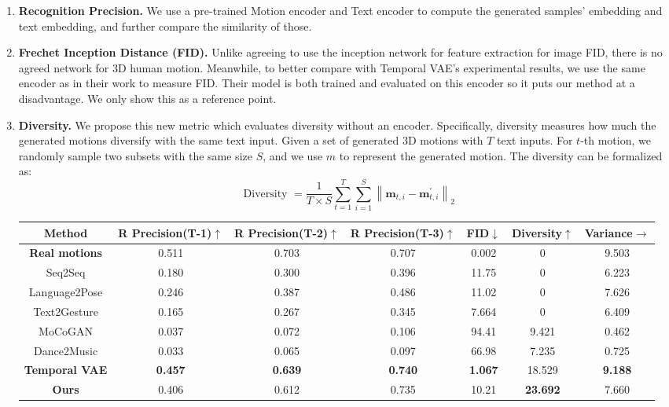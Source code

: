 \documentclass{article}
\begin{document}
\begin{enumerate}
  \item \textbf{Recognition Precision.} We use a pre-trained Motion encoder and Text encoder to compute the generated samples' embedding and text embedding, and further compare the similarity of those.
  \item \textbf{Frechet Inception Distance (FID).} Unlike agreeing to use the inception network for feature extraction for image FID, there is no agreed network for 3D human motion. Meanwhile, to better compare with Temporal VAE's experimental results, we use the same encoder as in their work to measure FID. Their model is both trained and evaluated on this encoder so it puts our method at a disadvantage. We only show this as a reference point.
  \item \textbf{Diversity.} We propose this new metric which evaluates diversity without an encoder. Specifically, diversity measures how much the generated motions diversify with the same text input. Given a set of generated 3D motions with $T$ text inputs. For $t$-th motion, we randomly sample two subsets with the same size $S$, and we use $m$ to represent the generated motion. The diversity can be formalized as:
\begin{equation}
    \text { Diversity }=\frac{1}{T \times S} \sum_{t=1}^{T} \sum_{i=1}^{S}\left\|\mathbf{m}_{t, i}-\mathbf{m}_{t, i}^{\prime}\right\|_{2}
\end{equation}
  
 \begin{table*}[ht!]
    \vspace{-4.5em}\centering
  \begin{tabular}{|c c c c c c c|}
  \hline
  \textbf{Method} & \textbf{R Precision(T-1)$\uparrow$} & \textbf{R Precision(T-2)$\uparrow$} & \textbf{R Precision(T-3)$\uparrow$} & \textbf{FID$\downarrow$} & \textbf{Diversity$\uparrow$} & \textbf{Variance$\rightarrow$} \\ [0.5ex] 
  \hline\hline
  \textbf{Real motions} & 0.511 & 0.703 & 0.707 & 0.002 & 0 & 9.503\\
  \hline
  Seq2Seq \cite{linvigil18} & 0.180 & 0.300 & 0.396 & 11.75 & 0 & 6.223 \\
  Language2Pose \cite{ahuja2019language2pose} & 0.246 & 0.387 & 0.486 & 11.02 & 0 & 7.626 \\
  Text2Gesture \cite{bhattacharya2021text2gestures} & 0.165 & 0.267 & 0.345 & 7.664 & 0 & 6.409 \\
  MoCoGAN \cite{tulyakov2018mocogan} & 0.037 &0.072 & 0.106 & 94.41 & 9.421 & 0.462 \\
  Dance2Music \cite{tang2018dance} & 0.033 & 0.065 & 0.097 & 66.98 & 7.235 & 0.725\\
  \textbf{Temporal VAE} \cite{guo2022generating} & \textbf{0.457} & \textbf{0.639} & \textbf{0.740} & \textbf{1.067} & 18.529 & \textbf{9.188} \\
  \hline
  \textbf{Ours} & 0.406 & 0.612 & 0.735 & 10.21 & \textbf{23.692} & 7.660\\
    \hline
 

\end{tabular}
\end{table*}
\end{enumerate}
\end{document}
